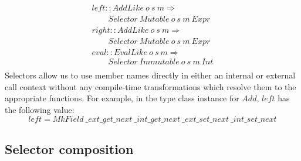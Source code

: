 \begin{displaymath}
\begin{array}{l}
\mathit{left} :: \mathit{AddLike}~o~s~m \Rightarrow \\
\qquad \mathit{Selector}~\mathit{Mutable}~o~s~m~\mathit{Expr} \\
\mathit{right} :: \mathit{AddLike}~o~s~m \Rightarrow \\
\qquad \mathit{Selector}~\mathit{Mutable}~o~s~m~\mathit{Expr} \\
\mathit{eval} :: \mathit{EvalLike}~o~s~m \Rightarrow \\
\qquad \mathit{Selector}~\mathit{Immutable}~o~s~m~\mathit{Int} \\
\end{array}
\end{displaymath}
Selectors allow us to use member names directly in either an internal or external call context without any compile-time transformations which resolve them to the appropriate functions. For example, in the type class instance for $\mathit{Add}$, $\mathit{left}$ has the following value:
\begin{displaymath}
\mathit{left} = \mathit{MkField}~\mathit{\_ext\_get\_next}~\mathit{\_int\_get\_next}~\mathit{\_ext\_set\_next}~\mathit{\_int\_set\_next}
\end{displaymath}

\subsection{Selector composition}

